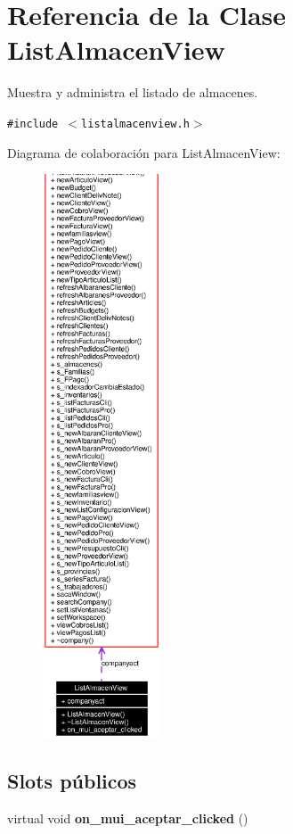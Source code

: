\section{Referencia de la Clase List\-Almacen\-View}
\label{classListAlmacenView}
Muestra y administra el listado de almacenes.  


{\tt \#include $<$listalmacenview.h$>$}

Diagrama de colaboraci\'{o}n para List\-Almacen\-View:\begin{figure}[H]
\begin{center}
\leavevmode
\includegraphics[width=99pt]{classListAlmacenView__coll__graph}
\end{center}
\end{figure}
\subsection*{Slots p\'{u}blicos}
\begin{CompactItemize}
\item 
virtual void {\bf on\_\-mui\_\-aceptar\_\-clicked} ()\label{classListAlmacenView_i0}

\end{CompactItemize}

